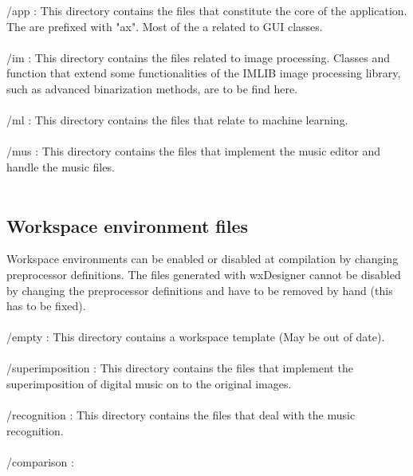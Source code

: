 \documentclass[]{article}
\begin{document}
/app : This directory contains the files that constitute the core of the application.
The are prefixed with "ax". Most of the a related to GUI classes.\\\\
/im : This directory contains the files related to image processing. Classes and
function that extend some functionalities of the IMLIB image processing library,
such as advanced binarization methods, are to be find here.\\\\
/ml : This directory contains the files that relate to machine learning.\\\\
/mus : This directory contains the files that implement the music editor and handle the music files.\\\\

\subsection{Workspace environment files}

Workspace environments can be enabled or disabled at compilation by changing
preprocessor definitions. The files generated with wxDesigner cannot be disabled
by changing the preprocessor definitions and have to be removed by hand (this
has to be fixed).\\\\
/empty : This directory contains a workspace template (May be out of date).\\\\ 
/superimposition : This directory contains the files that implement the superimposition
of digital music on to the original images.\\\\
/recognition : This directory contains the files that deal with the music recognition.\\\\
/comparison :
\end{document}
